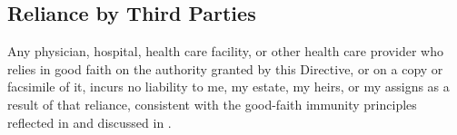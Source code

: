 \subsection{Reliance by Third Parties}
Any physician, hospital, health care facility, or other health care provider who relies in good faith on the authority granted by this Directive, or on a copy or facsimile of it, incurs no liability to me, my estate, my heirs, or my assigns as a result of that reliance, consistent with the good-faith immunity principles reflected in \citet{uhcda1993} and discussed in \citet{meisel2004}.
